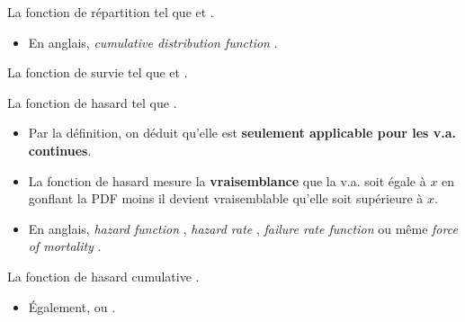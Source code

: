 \documentclass[french]{article}
\begin{document}
\begin{multicols*}{2}
\begin{definitionNOHFILL}
La fonction de répartition  tel que  et .

\begin{itemize}
	\item	En anglais, \og \textit{cumulative distribution function} \fg{}.
\end{itemize}
\end{definitionNOHFILL}

\begin{definitionNOHFILL}
La fonction de survie  tel que  et .
\end{definitionNOHFILL}

\begin{definitionNOHFILL}
La fonction de hasard  tel que .

\begin{itemize}
	\item	Par la définition, on déduit qu'elle est \textbf{seulement applicable pour les v.a. continues}.
	\item	La fonction de hasard mesure la \textbf{vraisemblance} que la v.a. soit égale à $x$ en gonflant la PDF moins il devient vraisemblable qu'elle soit supérieure à $x$.
\end{itemize}

\begin{itemize}
	\item	En anglais, \og \textit{hazard function} \fg{}, \og \textit{hazard rate} \fg{}, \og \textit{failure rate function} \fg{} ou même \og \textit{force of mortality} \fg{}.
\end{itemize}
\end{definitionNOHFILL}

\begin{definitionNOHFILL}
La fonction de hasard cumulative .
\begin{itemize}
	\item	Également,  ou .
\end{itemize}
\end{definitionNOHFILL}


\end{multicols*}
\end{document}
